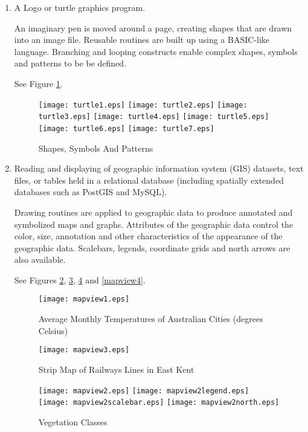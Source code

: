 \begin{enumerate}
\item

A Logo or turtle graphics program.

An imaginary pen is moved around a page,
creating shapes that are drawn into an image file.
Reusable routines are built up using a BASIC-like language.
Branching and looping constructs enable complex shapes, symbols and patterns
to be be defined.

See Figure \ref{turtle}.

\begin{figure}[htb]
\texttt{[image: turtle1.eps]}
\texttt{[image: turtle2.eps]}
\texttt{[image: turtle3.eps]}
\texttt{[image: turtle4.eps]}
\texttt{[image: turtle5.eps]}
\texttt{[image: turtle6.eps]}
\texttt{[image: turtle7.eps]}
\caption{Shapes, Symbols And Patterns}
\label{turtle}
\end{figure}

\item

Reading and displaying of geographic information
system (GIS) datasets, text files, or tables held in a relational database
(including spatially extended databases such as PostGIS and MySQL).

Drawing routines are applied to geographic data to produce annotated and
symbolized maps and graphs.  Attributes of the geographic data control
the color, size, annotation and other characteristics of the
appearance of the geographic data.
Scalebars, legends, coordinate grids and north arrows are also available.

See Figures \ref{mapview1}, \ref{mapview3}, \ref{mapview2} and
\ref{mapview4}.

\begin{figure}
\texttt{[image: mapview1.eps]}
\caption[Average Monthly Temperatures]{Average Monthly Temperatures of Australian Cities (degrees Celsius)}
\label{mapview1}
\end{figure}

\begin{figure}
\texttt{[image: mapview3.eps]}
\caption{Strip Map of Railways Lines in East Kent}
\label{mapview3}
\end{figure}

\begin{figure}

\texttt{[image: mapview2.eps]}
\texttt{[image: mapview2legend.eps]}
\vspace{1pt}
\texttt{[image: mapview2scalebar.eps]}
\texttt{[image: mapview2north.eps]}
\caption{Vegetation Classes}
\label{mapview2}
\end{figure}


\end{enumerate}
